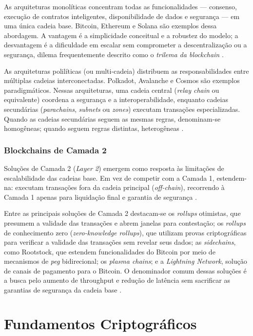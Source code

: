 \documentclass[12pt,a4paper]{report}
\begin{document}
As arquiteturas monolíticas concentram todas as funcionalidades --- consenso, execução de contratos inteligentes, disponibilidade de dados e segurança --- em uma única cadeia base. Bitcoin, Ethereum e Solana são exemplos dessa abordagem. A vantagem é a simplicidade conceitual e a robustez do modelo; a desvantagem é a dificuldade em escalar sem comprometer a descentralização ou a segurança, dilema frequentemente descrito como o \textit{trilema da blockchain} \cite{Bashir2023}.

As arquiteturas polilíticas (ou multi-cadeia) distribuem as responsabilidades entre múltiplas cadeias interconectadas. Polkadot, Avalanche e Cosmos são exemplos paradigmáticos. Nessas arquiteturas, uma cadeia central (\textit{relay chain} ou equivalente) coordena a segurança e a interoperabilidade, enquanto cadeias secundárias (\textit{parachains}, \textit{subnets} ou \textit{zones}) executam transações especializadas. Quando as cadeias secundárias seguem as mesmas regras, denominam-se homogêneas; quando seguem regras distintas, heterogêneas \cite{Bashir2023}.

\subsection{Blockchains de Camada 2}

Soluções de Camada 2 (\textit{Layer 2}) emergem como resposta às limitações de escalabilidade das cadeias base. Em vez de competir com a Camada 1, estendem-na: executam transações fora da cadeia principal (\textit{off-chain}), recorrendo à Camada 1 apenas para liquidação final e garantia de segurança \cite{Bashir2023}.

Entre as principais soluções de Camada 2 destacam-se os \textit{rollups} otimistas, que presumem a validade das transações e abrem janelas para contestação; os \textit{rollups} de conhecimento zero (\textit{zero-knowledge rollups}), que utilizam provas criptográficas para verificar a validade das transações sem revelar seus dados; as \textit{sidechains}, como Rootstock, que estendem funcionalidades do Bitcoin por meio de mecanismos de \textit{peg} bidirecional; os \textit{plasma chains}; e a \textit{Lightning Network}, solução de canais de pagamento para o Bitcoin. O denominador comum dessas soluções é a busca pelo aumento de throughput e redução de latência sem sacrificar as garantias de segurança da cadeia base \cite{Bashir2023}.

\chapter{Fundamentos Criptográficos}
\end{document}
